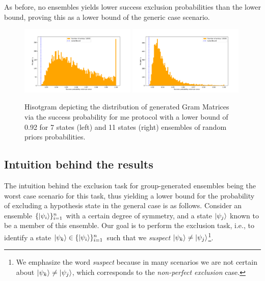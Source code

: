 \documentclass[12pt,letterpaper]{article}
\begin{document}
As before, no ensembles yields lower success exclusion probabilities than the lower bound, proving this as a lower bound of the generic case scenario.

\begin{figure}[H]
	\centering
	\includegraphics[width=0.49\textwidth, trim={1.0cm 0.3cm 2.4cm 1.5cm}, clip]{../Plots/ExclusionMinimumErrorRandomDistributionZ7Prob0.924.pdf}
	\includegraphics[width=0.49\textwidth, trim={1.0cm 0.3cm 2.4cm 1.5cm}, clip]{../Plots/ExclusionMinimumErrorRandomDistributionZ11Prob0.926.pdf}
	\caption{Hisotgram depicting the distribution of generated Gram Matrices via the success probability for \gls{me} protocol with a lower bound of 0.92 for 7 states (left) and 11 states (right) ensembles of random priors probabilities.}
	\label{FigureDistZ5ZE0.5}
\end{figure}


\subsection{Intuition behind the results}

\hspace{20pt}The intuition behind the exclusion task for group-generated ensembles being the worst case scenario for this task, thus yielding a lower bound for the probability of excluding a hypothesis state in the general case is as follows. Consider an ensemble $\{\ket{\psi_i}\}_{i=1}^n$ with a certain degree of symmetry, and a state $\ket{\psi_j}$ known to be a member of this ensemble. Our goal is to perform the exclusion task, i.e., to identify a state $\ket{\psi_k} \in \{\ket{\psi_i}\}_{i=1}^n$ such that we \emph{suspect} $\ket{\psi_k} \neq \ket{\psi_j}$\footnote{We emphasize the word \emph{suspect} because in many scenarios we are not certain about $\ket{\psi_k} \neq \ket{\psi_j}$, which corresponds to the \emph{non-perfect exclusion} case.}.
\end{document}
